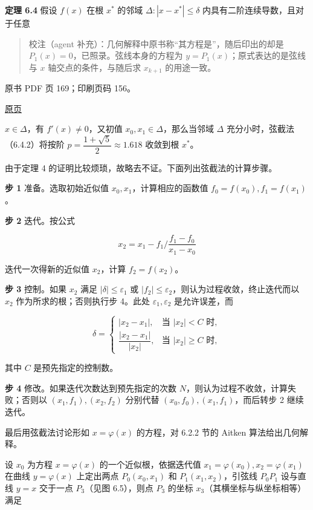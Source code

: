 \textbf{定理 6.4} 假设 \(f(x)\) 在根 \(x^*\) 的邻域 \(\Delta:|x-x^*|\leqslant\delta\) 内具有二阶连续导数，且对于任意

\begin{quote}
校注（agent 补充）：几何解释中原书称``其方程是''，随后印出的却是 \(P_1(x)=0\)，已照录。弦线本身的方程为 \(y=P_1(x)\)；原式表达的是弦线与 \(x\) 轴交点的条件，与随后求 \(x_{k+1}\) 的用途一致。
\end{quote}

\clearpage

原书 PDF 页 169；印刷页码 156。

\href{source-images/pdf-169.jpeg}{原页}

\(x\in\Delta\)，有 \(f'(x)\ne0\)，又初值 \(x_0,x_1\in\Delta\)，那么当邻域 \(\Delta\) 充分小时，弦截法（6.4.2）将按阶 \(p=\dfrac{1+\sqrt{5}}{2}\approx1.618\) 收敛到根 \(x^*\)。

由于定理 4 的证明比较烦琐，故略去不证。下面列出弦截法的计算步骤。

\textbf{步 1} 准备。选取初始近似值 \(x_0,x_1\)，计算相应的函数值 \(f_0=f(x_0),f_1=f(x_1)\)。

\textbf{步 2} 迭代。按公式

\[
x_2=x_1-f_1\bigg/\frac{f_1-f_0}{x_1-x_0}
\]

迭代一次得新的近似值 \(x_2\)，计算 \(f_2=f(x_2)\)。

\textbf{步 3} 控制。如果 \(x_2\) 满足 \(|\delta|\leqslant\varepsilon_1\) 或 \(|f_2|\leqslant\varepsilon_2\)，则认为过程收敛，终止迭代而以 \(x_2\) 作为所求的根；否则执行步 4。此处 \(\varepsilon_1,\varepsilon_2\) 是允许误差，而

\[
\delta=\begin{cases}
|x_2-x_1|,&\text{当 }|x_2|<C\text{ 时},\\
\dfrac{|x_2-x_1|}{|x_2|},&\text{当 }|x_2|\geqslant C\text{ 时},
\end{cases}
\]

其中 \(C\) 是预先指定的控制数。

\textbf{步 4} 修改。如果迭代次数达到预先指定的次数 \(N\)，则认为过程不收敛，计算失败；否则以 \((x_1,f_1),(x_2,f_2)\) 分别代替 \((x_0,f_0),(x_1,f_1)\)，而后转步 2 继续迭代。

最后用弦截法讨论形如 \(x=\varphi(x)\) 的方程，对 6.2.2 节的 Aitken 算法给出几何解释。

设 \(x_0\) 为方程 \(x=\varphi(x)\) 的一个近似根，依据迭代值 \(x_1=\varphi(x_0),x_2=\varphi(x_1)\) 在曲线 \(y=\varphi(x)\) 上定出两点 \(P_0(x_0,x_1)\) 和 \(P_1(x_1,x_2)\)，引弦线 \(P_0P_1\) 设与直线 \(y=x\) 交于一点 \(P_3\)（见图 6.5），则点 \(P_3\) 的坐标 \(x_3\)（其横坐标与纵坐标相等）满足

